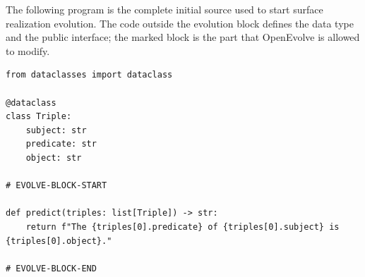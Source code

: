 The following program is the complete initial source used to start surface
realization evolution. The code outside the evolution block defines the data
type and the public interface; the marked block is the part that OpenEvolve is
allowed to modify.

\begin{lstlisting}
from dataclasses import dataclass

@dataclass
class Triple:
    subject: str
    predicate: str
    object: str

# EVOLVE-BLOCK-START

def predict(triples: list[Triple]) -> str:
    return f"The {triples[0].predicate} of {triples[0].subject} is {triples[0].object}."

# EVOLVE-BLOCK-END
\end{lstlisting}
